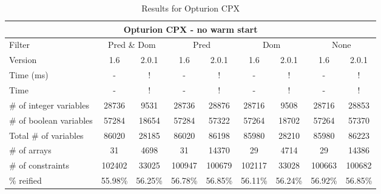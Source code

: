 \documentclass{standalone}
\begin{document}
\begin{table}[H]
\footnotesize
\centering
\begin{tabular}{lc|c|c|c|c|c|c|c}
\multicolumn{9}{c}{Opturion CPX - no warm start} \\ 
\hline\hline Filter & \multicolumn{2}{c|}{Pred \& Dom} &\multicolumn{2}{c|}{Pred}  & \multicolumn{2}{c|}{Dom} & \multicolumn{2}{c}{None} \\ 
\hline Version & 1.6 & 2.0.1 & 1.6 & 2.0.1 & 1.6 & 2.0.1 & 1.6 & 2.0.1 \\ 
Time (ms)               &    -     & !       & -       & !       & -       & !       & -       & !       \\ 
Time                    &    -     & !       & -       & !       & -       & !       & -       & !       \\ 
\# of integer variables & 28736    & 9531    & 28736   & 28876   & 28716   & 9508    & 28716   & 28853	  \\ 
\# of boolean variables & 57284    & 18654   & 57284   & 57322   & 57264   & 18702   & 57264   & 57370	  \\ 
Total \# of variables & 86020    & 28185   & 86020   & 86198   & 85980   & 28210   & 85980   & 86223	  \\ 
\# of arrays            & 31       & 4698    & 31      & 14370   & 29      & 4714   & 29      & 14386	  \\ 
\# of constraints       & 102402   & 33025   & 100947  & 100679  & 102117  & 33028   & 100663  & 100682  \\ 
\% reified               & 55.98\%  & 56.25\% & 56.78\% & 56.85\% & 56.11\% & 56.24\% & 56.92\% & 56.85\% \\ 
\end{tabular}
\caption{Results for Opturion CPX}\label{tab:res_cpx}
\end{table}
\end{document}
